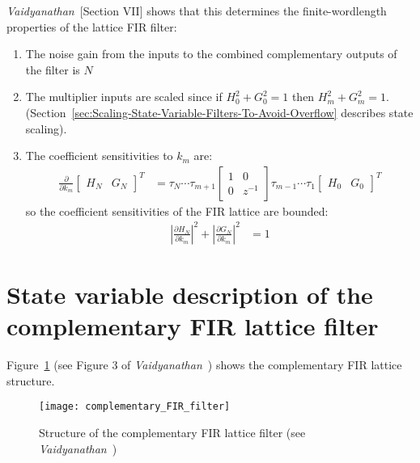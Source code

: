 \documentclass[a4paper,twoside,10pt,english]{report}
\begin{document}
\emph{Vaidyanathan}~\cite{Vaidyanathan_PassiveCascadedLatticeFIR}[Section VII]
shows that this determines the finite-wordlength properties of the lattice FIR
filter:
\begin{enumerate}
  \item The noise gain from the inputs to the combined complementary outputs
    of the filter is $N$
  \item The multiplier inputs are scaled since if $H_{0}^{2}+G_{0}^{2}= 1$
    then $H_{m}^{2}+G_{m}^{2}= 1$.
    (Section~\ref{sec:Scaling-State-Variable-Filters-To-Avoid-Overflow}
    describes state scaling).
    
  \item The coefficient sensitivities to $k_{m}$ are:
  \begin{align*}
    \frac{\partial}{\partial k_{m}}
    \left[\begin{array}{cc}
    H_{N}&G_{N}\end{array}\right]^{T}
 &=\tau_{N}\cdots\tau_{m+1}
   \left[\begin{array}{cc}
           1 & 0 \\
           0 & z^{-1}
         \end{array}\right]\tau_{m-1}\cdots\tau_{1}
    \left[\begin{array}{cc}
    H_{0}&G_{0}\end{array}\right]^{T}
  \end{align*}
  so the coefficient sensitivities of the FIR lattice are bounded:
  \begin{align*} 
    \left|\frac{\partial H_{N}}{\partial k_{m}}\right|^{2}
    +\left|\frac{\partial G_{N}}{\partial k_{m}}\right|^{2} &= 1
  \end{align*}
\end{enumerate}

\section{\label{sec:State-variable-description-of-complementary-FIR-lattice-filter}State variable description of the complementary FIR lattice filter}
Figure~\ref{fig:complementary-FIR-filter-structure} (see Figure 3 of
\emph{Vaidyanathan}~\cite{Vaidyanathan_PassiveCascadedLatticeFIR})
shows the complementary FIR lattice structure.
\begin{figure}[!htbp]
\begin{center}
\texttt{[image: complementary\_FIR\_filter]}
\caption{Structure of the complementary FIR lattice filter
(see \emph{Vaidyanathan}~\cite[Figure 3]{Vaidyanathan_PassiveCascadedLatticeFIR})}
\label{fig:complementary-FIR-filter-structure}
\end{center}
\end{figure}
\end{document}
